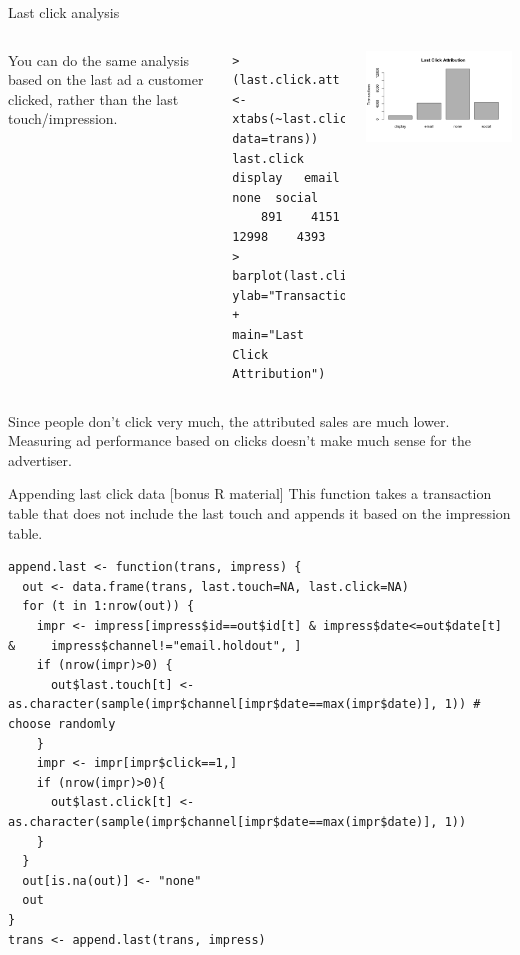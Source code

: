 \documentclass[10pt, aspectratio=169]{beamer}
\begin{document}
\begin{frame}[fragile]{Last click analysis}
\begin{columns}
You can do the same analysis based on the last ad a customer clicked, rather than the last touch/impression. 
\footnotesize
\begin{lstlisting}
> (last.click.att <- xtabs(~last.click, data=trans))
last.click
display   email    none  social 
    891    4151   12998    4393 
> barplot(last.click.att, ylab="Transactions", 
+         main="Last Click Attribution")
\end{lstlisting}
\includegraphics[width=\textwidth]{images/lastclick.png}
\end{columns}
\alert{Since people don't click very much, the attributed sales are much lower. Measuring ad performance based on clicks doesn't make much sense for the advertiser.}
\end{frame}

\begin{frame}[fragile]{Appending last click data [bonus R material]}
This function takes a transaction table that does not include the last touch and appends it based on the impression table. 
\footnotesize
\begin{lstlisting}[basicstyle=\tiny\ttfamily]
append.last <- function(trans, impress) {
  out <- data.frame(trans, last.touch=NA, last.click=NA)
  for (t in 1:nrow(out)) {
    impr <- impress[impress$id==out$id[t] & impress$date<=out$date[t] &     impress$channel!="email.holdout", ]
    if (nrow(impr)>0) {
      out$last.touch[t] <- as.character(sample(impr$channel[impr$date==max(impr$date)], 1)) # choose randomly
    }
    impr <- impr[impr$click==1,]
    if (nrow(impr)>0){
      out$last.click[t] <- as.character(sample(impr$channel[impr$date==max(impr$date)], 1))
    }
  }
  out[is.na(out)] <- "none"
  out
}
trans <- append.last(trans, impress)
\end{lstlisting}
\end{frame}
\end{document}
